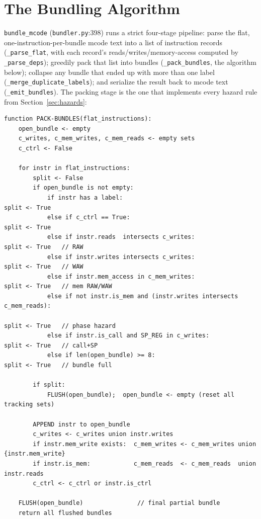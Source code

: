 \documentclass[11pt,a4paper]{article}
\begin{document}
\section{The Bundling Algorithm}
\label{sec:algo}

\texttt{bundle\_mcode} (\texttt{bundler.py}:398) runs a strict four-stage pipeline:
parse the flat, one-instruction-per-bundle mcode text into a list of instruction records
(\texttt{\_parse\_flat}, with each record's reads/writes/memory-access computed by
\texttt{\_parse\_deps}); greedily pack that list into bundles (\texttt{\_pack\_bundles},
the algorithm below); collapse any bundle that ended up with more than one label
(\texttt{\_merge\_duplicate\_labels}); and serialize the result back to mcode text
(\texttt{\_emit\_bundles}). The packing stage is the one that implements every hazard
rule from Section~\ref{sec:hazards}:

\begin{lstlisting}[style=pseudostyle, caption={\texttt{\_pack\_bundles}, bundler.py:279--349 (essence)}]
function PACK-BUNDLES(flat_instructions):
    open_bundle <- empty
    c_writes, c_mem_writes, c_mem_reads <- empty sets
    c_ctrl <- False

    for instr in flat_instructions:
        split <- False
        if open_bundle is not empty:
            if instr has a label:                                    split <- True
            else if c_ctrl == True:                                    split <- True
            else if instr.reads  intersects c_writes:                  split <- True   // RAW
            else if instr.writes intersects c_writes:                  split <- True   // WAW
            else if instr.mem_access in c_mem_writes:                  split <- True   // mem RAW/WAW
            else if not instr.is_mem and (instr.writes intersects c_mem_reads):
                                                                        split <- True   // phase hazard
            else if instr.is_call and SP_REG in c_writes:               split <- True   // call+SP
            else if len(open_bundle) >= 8:                             split <- True   // bundle full

        if split:
            FLUSH(open_bundle);  open_bundle <- empty (reset all tracking sets)

        APPEND instr to open_bundle
        c_writes <- c_writes union instr.writes
        if instr.mem_write exists:  c_mem_writes <- c_mem_writes union {instr.mem_write}
        if instr.is_mem:            c_mem_reads  <- c_mem_reads  union instr.reads
        c_ctrl <- c_ctrl or instr.is_ctrl

    FLUSH(open_bundle)               // final partial bundle
    return all flushed bundles
\end{lstlisting}
\end{document}
